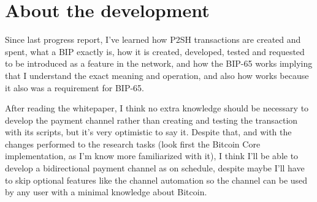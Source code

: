 \section{About the development}
Since last progress report, I've learned how P2SH transactions are created and spent, what a BIP exactly is, how it is created, developed, tested and requested to be introduced as a feature in the network, and how the BIP-65 works implying that I understand the  exact meaning and operation, and also how  works because it also was a requirement for BIP-65.

After reading the whitepaper, I think no extra knowledge should be necessary to develop the payment channel rather than creating and testing the transaction with its scripts, but it's very optimistic to say it. Despite that, and with the changes performed to the research tasks (look first the Bitcoin Core implementation, as I'm know more familiarized with it), I think I'll be able to develop a bidirectional payment channel as on schedule, despite maybe I'll have to skip optional features like the channel automation so the channel can be used by any user with a minimal knowledge about Bitcoin.

